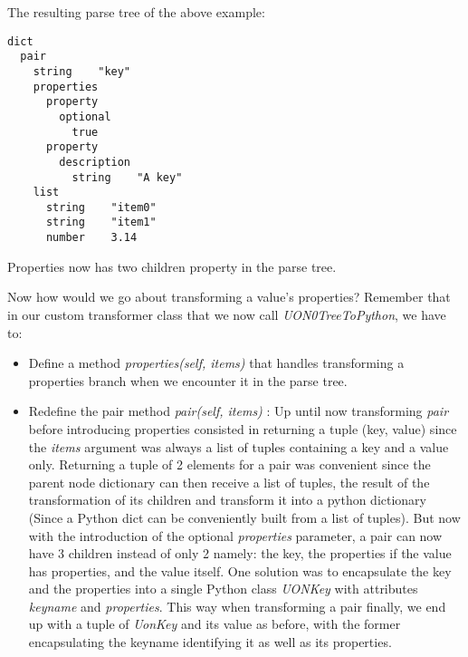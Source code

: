 \documentclass[12pt]{article}
\begin{document}
The resulting parse tree of the above example:

\begin{lstlisting}
dict
  pair
    string    "key"
    properties
      property
        optional
          true
      property
        description
          string    "A key"
    list
      string    "item0"
      string    "item1"
      number    3.14

\end{lstlisting}

Properties now has two children property in the parse tree.

Now how would we go about transforming a value’s properties? Remember that in our custom transformer class that we now call \emph{UON0TreeToPython}, we have to:
\begin{itemize}
    \item Define a method \emph{properties(self, items)} that handles transforming a properties branch when we encounter it in the parse tree. 
    \item Redefine the pair method \emph{pair(self, items)} : Up until now transforming \emph{pair} before introducing properties consisted in returning a tuple (key, value) since the \emph{items} argument was always a list of tuples containing a key and a value only. Returning a tuple of 2 elements for a pair was convenient since the parent node dictionary can then receive a list of tuples, the result of the transformation of its children and transform it into a python dictionary (Since a Python dict can be conveniently built from a list of tuples). But now with the introduction of the optional \emph{properties} parameter, a pair can now have 3 children instead of only 2 namely: the key, the properties if the value has properties, and the value itself. One solution was to encapsulate the key and the properties into a single Python class \emph{UONKey} with attributes \emph{keyname} and \emph{properties}. This way when transforming a pair finally, we end up with a tuple of \emph{UonKey} and its value as before, with the former encapsulating the keyname identifying it as well as its properties.
\end{itemize}
    
\end{document}
